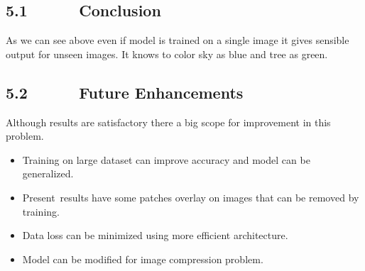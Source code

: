 \documentclass[12pt]{article}
\begin{document}
\subsection*{5.1\ \ \ \ \ \  Conclusion}
As we can see above even if model is trained on a single image it gives sensible output for unseen images. It knows to color sky as blue and tree as green.\par

 \par

\subsection*{5.2\ \ \ \ \ \  Future Enhancements}
\begin{justify}
Although results are satisfactory there a big scope for improvement in this problem.
\end{justify}\par

\begin{itemize}
	\item Training on large dataset can improve accuracy and model can be generalized.\par

	\item Present\ results have some patches overlay on images that can be removed  by training.\par

	\item Data loss can be minimized using more efficient architecture.\par

	\item Model can be modified for image compression problem.
\end{itemize}\par

\begin{justify}
 
\end{justify}\par


\vspace{\baselineskip}
\setlength{\parskip}{9.96pt}
\end{document}
